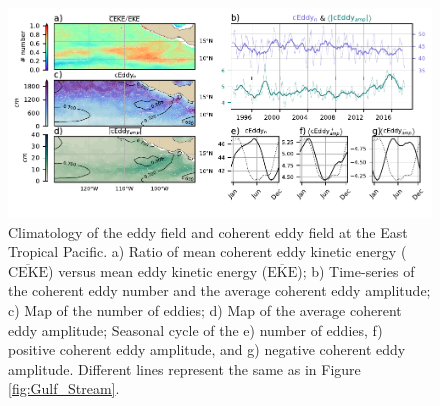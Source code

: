 \documentclass[draft,linenumbers]{agujournal2019}
\newcommand{\MEKE}{\overline{\textrm{EKE}}}
\newcommand{\MCEKE}{\overline{\textrm{CEKE}}}
\begin{document}
	\begin{figure}
	    \centering
	    \includegraphics[width=1\textwidth]{figures/regional_ratios_and_stats_V3_3.pdf}
	    \caption{Climatology of the eddy field and coherent eddy field at the East Tropical Pacific. a) Ratio of mean coherent eddy kinetic energy ($\MCEKE$) versus mean eddy kinetic energy ($\MEKE$); b) Time-series of the coherent eddy number and the average coherent eddy amplitude; c) Map of the number of eddies; d) Map of the average coherent eddy amplitude; Seasonal cycle of the e) number of eddies, f) positive coherent eddy amplitude, and g) negative coherent eddy amplitude. Different lines represent the same as in Figure \ref{fig:Gulf_Stream}.}
	    \label{fig:tehuantepec}
	\end{figure}	
	







\end{document}
